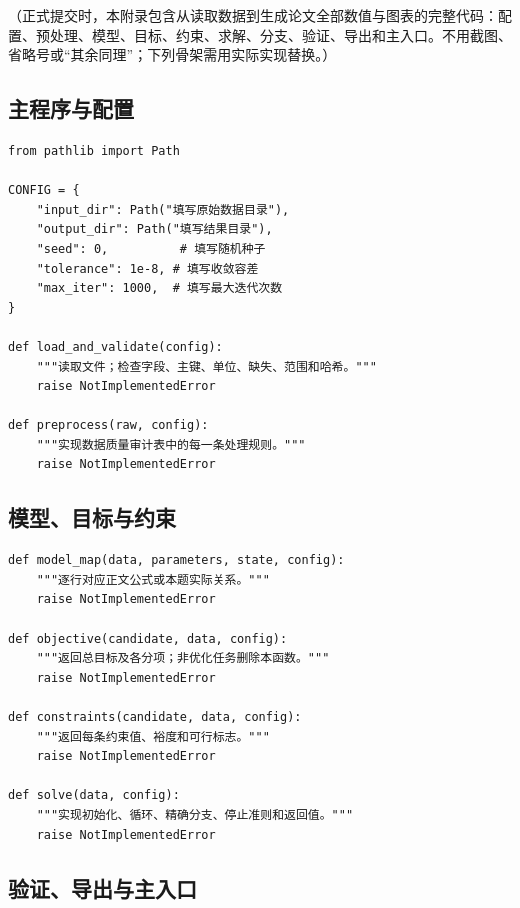 \documentclass[UTF8,zihao=-4]{ctexart}
\newcommand{\fillin}[1]{（#1）}
\begin{document}
\fillin{正式提交时，本附录包含从读取数据到生成论文全部数值与图表的完整代码：配置、预处理、模型、目标、约束、求解、分支、验证、导出和主入口。不用截图、省略号或“其余同理”；下列骨架需用实际实现替换。}

\subsection{主程序与配置}

\begin{Verbatim}[fontsize=\scriptsize,breaklines=true,breakanywhere=true,frame=single]
from pathlib import Path

CONFIG = {
    "input_dir": Path("填写原始数据目录"),
    "output_dir": Path("填写结果目录"),
    "seed": 0,          # 填写随机种子
    "tolerance": 1e-8, # 填写收敛容差
    "max_iter": 1000,  # 填写最大迭代次数
}

def load_and_validate(config):
    """读取文件；检查字段、主键、单位、缺失、范围和哈希。"""
    raise NotImplementedError

def preprocess(raw, config):
    """实现数据质量审计表中的每一条处理规则。"""
    raise NotImplementedError
\end{Verbatim}

\subsection{模型、目标与约束}

\begin{Verbatim}[fontsize=\scriptsize,breaklines=true,breakanywhere=true,frame=single]
def model_map(data, parameters, state, config):
    """逐行对应正文公式或本题实际关系。"""
    raise NotImplementedError

def objective(candidate, data, config):
    """返回总目标及各分项；非优化任务删除本函数。"""
    raise NotImplementedError

def constraints(candidate, data, config):
    """返回每条约束值、裕度和可行标志。"""
    raise NotImplementedError

def solve(data, config):
    """实现初始化、循环、精确分支、停止准则和返回值。"""
    raise NotImplementedError
\end{Verbatim}

\clearpage
\subsection{验证、导出与主入口}
\end{document}
